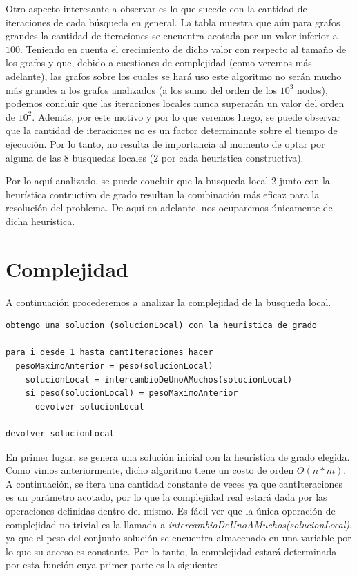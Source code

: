 \documentclass[a4paper,11pt] {article}
\begin{document}
Otro aspecto interesante a observar es lo que sucede con la cantidad de iteraciones de cada búsqueda en general. La tabla muestra que aún para grafos grandes la cantidad de iteraciones se encuentra acotada por un valor inferior a $100$. Teniendo en cuenta el crecimiento de dicho valor con respecto al tamaño de los grafos y que, debido a cuestiones de complejidad (como veremos más adelante), las grafos sobre los cuales se hará uso este algoritmo no serán mucho más grandes a los grafos analizados (a los sumo del orden de los $10^3$ nodos), podemos concluir que las iteraciones locales nunca superarán un valor del orden de $10^2$. Además, por este motivo y por lo que veremos luego, se puede observar que la cantidad de iteraciones no es un factor determinante sobre el tiempo de ejecución. Por lo tanto, no resulta de importancia al momento de optar por alguna de las 8 busquedas locales (2 por cada heurística constructiva).

Por lo aquí analizado, se puede concluir que la busqueda local 2 junto con la heurística contructiva de grado resultan la combinación más eficaz para la resolución del problema. De aquí en adelante, nos ocuparemos únicamente de dicha heurística.

\section*{Complejidad}

A continuación procederemos a analizar la complejidad de la busqueda local.

\begin{verbatim}
obtengo una solucion (solucionLocal) con la heuristica de grado

para i desde 1 hasta cantIteraciones hacer
  pesoMaximoAnterior = peso(solucionLocal)
    solucionLocal = intercambioDeUnoAMuchos(solucionLocal)
    si peso(solucionLocal) = pesoMaximoAnterior
      devolver solucionLocal

devolver solucionLocal
\end{verbatim}

En primer lugar, se genera una solución inicial con la heuristica de grado elegida. Como vimos anteriormente, dicho algoritmo tiene un costo de orden $O(n*m)$. A continuación, se itera una cantidad constante de veces ya que cantIteraciones es un parámetro acotado, por lo que la complejidad real estará dada por las operaciones definidas dentro del mismo. Es fácil ver que la única operación de complejidad no trivial es la llamada a \textit{intercambioDeUnoAMuchos(solucionLocal)}, ya que el peso del conjunto solución se encuentra almacenado en una variable por lo que su acceso es constante. Por lo tanto, la complejidad estará determinada por esta función cuya primer parte es la siguiente:
\end{document}
